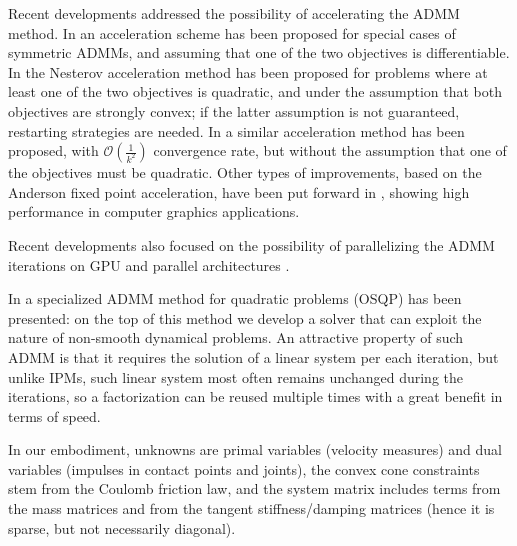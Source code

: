 \documentclass[AMA,STIX1COL]{WileyNJD-v2}
\begin{document}
Recent developments addressed the possibility of accelerating the ADMM method.
In 
 \cite{Goldfarb2013} %
an acceleration scheme has been proposed for special cases of symmetric ADMMs, and assuming that one of the two objectives is differentiable.
%
In 
 \cite{Goldstein2014} %
the Nesterov acceleration method has been proposed for problems where at least one of the two objectives is quadratic, and under the assumption that both objectives are strongly convex; if the latter assumption is not guaranteed, restarting strategies are needed. 
%
In 
 \cite{Kadkhodaie2015} %
a similar acceleration method has been proposed, with $\mathcal{O}(\frac{1}{k^2})$ convergence rate, but without the assumption that one of the objectives must be quadratic.
%
Other types of improvements, based on the Anderson fixed point acceleration, have been put forward in 
 \cite{Zhang2019} %
 \cite{Ouyang2020} %
, showing high performance in computer graphics applications.

Recent developments also focused on the possibility of parallelizing the ADMM iterations on GPU and parallel architectures
\cite{Schubiger2020}. %

In
\cite{Stellato2020} %
a specialized ADMM method for quadratic problems (OSQP) has been presented: on the top of this method we develop a solver that can exploit the nature of non-smooth dynamical problems. An attractive property of such ADMM is that it requires the solution of a linear system per each iteration, but unlike IPMs, such linear system most often remains unchanged during the iterations, so a factorization can be reused multiple times with a great benefit in terms of speed.

In our embodiment, unknowns are primal variables (velocity measures) and dual variables (impulses in contact points and joints), the convex cone constraints stem from the Coulomb friction law, and the system matrix includes terms from the mass matrices and from the tangent stiffness/damping matrices (hence it is sparse, but not necessarily diagonal).
\end{document}
